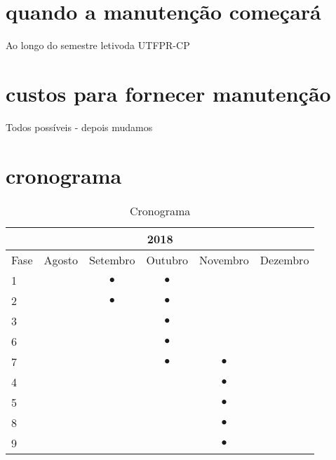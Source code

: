 \section{quando a manutenção começará}
Ao longo do semestre letivoda UTFPR-CP
\section{custos para fornecer manutenção}
Todos possíveis - depois mudamos
\section{cronograma}
\begin{table}[!htb]
  \caption{Cronograma}
  \label{tab:cronograma}
  \begin{center}
	  \begin{tabular}{l||c|c|c|c|c}
	    \multicolumn{6}{c}{2018} \\ \hline \hline
	    {Fase}&  Agosto  &  Setembro & Outubro  & Novembro & Dezembro  \\ \hline
	    1    &           & $\bullet$ & $\bullet$&          &           \\
	    2    &           & $\bullet$ & $\bullet$&          &           \\
	    3    &           &           & $\bullet$& 				 &           \\
			6    &           &           & $\bullet$&          &           \\
			7    &           &           & $\bullet$& $\bullet$&           \\
	    4    &           &           &          & $\bullet$&					 \\
	    5    &           &           &          & $\bullet$& 					 \\
			8    &           &           &          & $\bullet$&           \\
			9    &           &           &          & $\bullet$&          	\\
	  \end{tabular}
	  \end{center}
\end{table}
